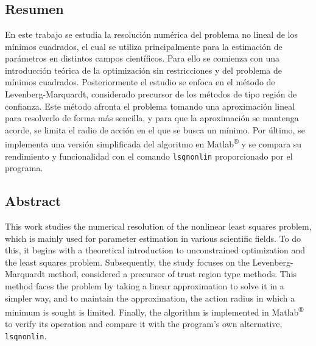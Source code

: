 \documentclass[11pt,a4paper]{book}
\theoremstyle{definition}
\theoremstyle{remark}
\def\code#1{\texttt{#1}}
\begin{document}

{}		
\chapter*{}

\section*{Resumen}

En este trabajo se estudia la resolución numérica del problema no lineal de los mínimos cuadrados, el cual se utiliza principalmente
para la estimación de parámetros en distintos campos científicos. Para ello se comienza con una introducción teórica de la optimización sin restricciones y del problema de mínimos cuadrados. Posteriormente el estudio se enfoca en el método de Levenberg-Marquardt, considerado precursor de los métodos de tipo región de confianza. Este método afronta el problema tomando una aproximación lineal para resolverlo de forma más sencilla, y para que la aproximación se mantenga acorde, se limita el radio de acción en el que se busca un mínimo. Por último, se implementa una versión simplificada del algoritmo en Matlab\textsuperscript{®} y se compara su rendimiento y funcionalidad con el comando \code{lsqnonlin} proporcionado por el programa.




\vspace{1.5cm}

\section*{Abstract}


This work studies the numerical resolution of the nonlinear least squares problem, which is mainly used for parameter estimation in various scientific fields. To do this, it begins with a theoretical introduction to unconstrained optimization and the least squares problem. Subsequently, the study focuses on the Levenberg-Marquardt method, considered a precursor of trust region type methods. This method faces the problem by taking a linear approximation to solve it in a simpler way, and to maintain the approximation, the action radius in which a minimum is sought is limited. Finally, the algorithm is implemented in Matlab\textsuperscript{®} to verify its operation and compare it with the program's own alternative, \code{lsqnonlin}.
\end{document}
